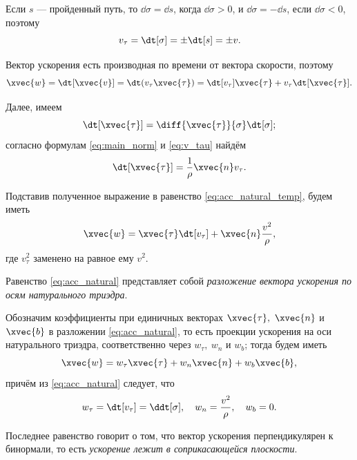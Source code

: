 Если $s$ --- пройденный путь, то $\dd{\sigma} = \dd{s}$, когда
$\dd{\sigma} > 0$, и $\dd{\sigma} = -\dd{s}$, если $\dd{\sigma} <0$, поэтому
\begin{equation}
  \label{eq:v_tau}
  v_\tau = \dt[\sigma] = \pm \dt[s] = \pm v.
\end{equation}

Вектор ускорения есть производная по времени от вектора скорости, поэтому
\begin{equation}
  \label{eq:acc_natural_temp}
  \xvec{w} = \dt[\xvec{v}] = \dt (v_\tau \xvec{\tau}) = \dt[v_\tau] \xvec{\tau} +
    v_\tau \dt[\xvec{\tau}].
\end{equation}

Далее, имеем
\begin{equation*}
  \dt[\xvec{\tau}] = \diff{\xvec{\tau}}{\sigma} \dt[\sigma];
\end{equation*}
согласно формулам \ref{eq:main_norm} и \ref{eq:v_tau} найдём
\begin{equation*}
  \dt[\xvec{\tau}] = \frac{1}{\rho} \xvec{n} v_\tau.
\end{equation*}

Подставив полученное выражение в равенство \ref{eq:acc_natural_temp}, будем
иметь
\begin{equation}
  \label{eq:acc_natural}
  \xvec{w} = \xvec{\tau} \dt[v_\tau] + \xvec{n} \frac{v^2}{\rho},
\end{equation}
где $v_\tau^2$ заменено на равное ему $v^2$.

Равенство \ref{eq:acc_natural} представляет собой \textit{разложение вектора
ускорения по осям натурального триэдра}.

Обозначим коэффициенты при единичных векторах $\xvec{\tau},~\xvec{n}$ и $\xvec{b}$
в разложении \ref{eq:acc_natural}, то есть проекции ускорения на оси
натурального триэдра, соответственно через $w_\tau,~w_n$ и $w_b$; тогда будем
иметь
\begin{equation}
  \label{eq:acc_natural_general}
  \xvec{w} = w_\tau \xvec{\tau} + w_n \xvec{n} + w_b \xvec{b},
\end{equation}
причём из \autoref{eq:acc_natural} следует, что
\begin{equation*}
  w_\tau = \dt[v_\tau] = \ddt[\sigma], \quad w_n = \frac{v^2}{\rho},
    \quad w_b = 0.
\end{equation*}

Последнее равенство говорит о том, что вектор ускорения перпендикулярен к
бинормали, то есть \textit{ускорение лежит в соприкасающейся плоскости}.

